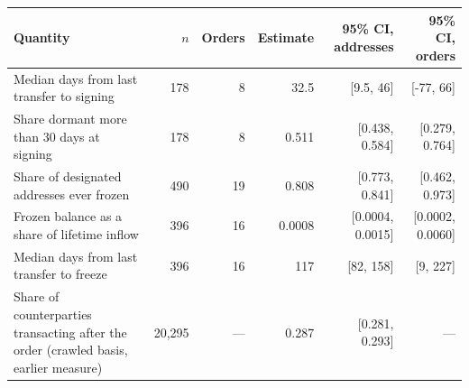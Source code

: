 \caption{\textbf{Interval estimates for the reported quantities.} Seizure orders are not randomly assigned, so these are not tests of an intervention; they state how far each statistic would move under a different draw of the sample that produced it. Two units are reported. Resampling addresses treats the designated addresses as independent draws, which overstates the information available: addresses named in the same order share a date, an issuer and usually an operator. Resampling orders, and carrying their addresses with them, is the conservative reading, and only eight orders fall inside the observation window, so those intervals are wide. Where the two disagree, the order-level interval is the one to believe. Percentile intervals from 2,000 resamples, except the last row, which is a normal approximation over counterparties treated as independent and has no order-level analogue. The order-level column resamples the orders that contribute to each row: the eight orders inside the observation window for the timing rows, all nineteen signing dates for freeze coverage (two orders share one date), and the orders with at least one frozen address for the two frozen-address rows.}
\label{tab:uncertainty}
\small
\begin{tabular}{lrrrrr}
\toprule
Quantity & $n$ & Orders & Estimate & 95\% CI, addresses & 95\% CI, orders \\
\midrule
Median days from last transfer to signing & 178 & 8 & 32.5 & [9.5, 46] & [-77, 66] \\
Share dormant more than 30 days at signing & 178 & 8 & 0.511 & [0.438, 0.584] & [0.279, 0.764] \\
Share of designated addresses ever frozen & 490 & 19 & 0.808 & [0.773, 0.841] & [0.462, 0.973] \\
Frozen balance as a share of lifetime inflow & 396 & 16 & 0.0008 & [0.0004, 0.0015] & [0.0002, 0.0060] \\
Median days from last transfer to freeze & 396 & 16 & 117 & [82, 158] & [9, 227] \\
Share of counterparties transacting after the order (crawled basis, earlier measure) & 20,295 & --- & 0.287 & [0.281, 0.293] & --- \\
\bottomrule
\end{tabular}
